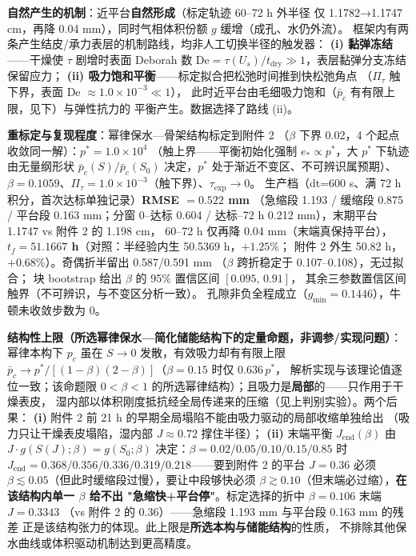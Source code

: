 \documentclass[12pt,a4paper]{ctexart}
\numberwithin{equation}{section}
\begin{document}
\textbf{自然产生的机制}：近平台\textbf{自然形成}（标定轨迹 60--72 h 外半径
仅 1.1782→1.1747 cm，再降 0.04 mm），同时气相体积份额 $g$ 缓增（成孔、水仍外流）。
框架内有两条产生结皮/承力表层的机制路线，均非人工切换半径的触发器：
\textbf{(i) 黏弹冻结}——干燥使 $\tau$ 剧增时表面 Deborah 数
$\mathrm{De}=\tau(U_s)/t_{\mathrm{dry}}\gg1$，表层黏弹分支冻结保留应力；
\textbf{(ii) 吸力饱和平衡}——标定拟合把松弛时间推到快松弛角点
（$\Pi_\tau$ 触下界，表面 De $\approx1.0\times10^{-3}\ll1$），
此时近平台由毛细吸力饱和（$\bar p_c$ 有有限上限，见下）与弹性抗力的
平衡产生。数据选择了路线 (ii)。

\textbf{重标定与复现程度}：幂律保水—骨架结构标定到附件 2
（$\beta$ 下界 0.02，4 个起点收敛同一解）：$p^*=1.0\times10^{4}$
（触上界——平衡初始化强制 $e_*\propto p^*$，大 $p^*$ 下轨迹由无量纲形状
$\bar p_c(S)/\bar p_c(S_0)$ 决定，$p^*$ 处于渐近不变区、不可辨识属预期）、
$\beta=0.1059$、$\Pi_\tau=1.0\times10^{-3}$（触下界）、$\tau_{\exp}\to0$。
生产档（dt=600 s、满 72 h 积分，首次达标单独记录）\textbf{RMSE $=0.522$ mm}
（急缩段 1.193 / 缓缩段 0.875 / 平台段 0.163 mm；分窗 0--达标 0.604 /
达标--72 h 0.212 mm），末期平台 1.1747 vs 附件 2 的 1.198 cm，
60--72 h 仅再降 0.04 mm（末端真保持平台），
\textbf{$t_f=51.1667$ h}（对照：半经验内生 50.5369 h，$+1.25\%$；
附件 2 外生 50.82 h，$+0.68\%$）。奇偶折半留出 0.587/0.591 mm
（$\beta$ 跨折稳定于 0.107--0.108），无过拟合；
块 bootstrap 给出 $\beta$ 的 95\% 置信区间 $[0.095,\,0.91]$，
其余三参数置信区间触界（不可辨识，与不变区分析一致）。
孔隙非负全程成立（$g_{\min}=0.1446$），牛顿未收敛步数为 0。

\textbf{结构性上限（所选幂律保水—简化储能结构下的定量命题，非调参/实现问题）}：
幂律本构下 $p_c$ 虽在 $S\to0$ 发散，有效吸力却有有限上限
$\bar p_c\to p^*/[(1-\beta)(2-\beta)]$（$\beta=0.15$ 时仅 $0.636\,p^*$，
解析实现与该理论值逐位一致；该命题限 $0<\beta<1$ 的所选幂律结构）；且吸力是\textbf{局部}的——只作用于干燥表皮，
湿内部以体积刚度抵抗经全局传递来的压缩（见上判别实验）。两个后果：
\textbf{(i)} 附件 2 前 21 h 的早期全局塌陷不能由吸力驱动的局部收缩单独给出
（吸力只让干燥表皮塌陷，湿内部 $J\approx0.72$ 撑住半径）；
\textbf{(ii)} 末端平衡 $J_{\mathrm{end}}(\beta)$ 由
$J\cdot g(S(J);\beta)=g(S_0;\beta)$ 决定：$\beta=0.02/0.05/0.10/0.15/0.85$
时 $J_{\mathrm{end}}=0.368/0.356/0.336/0.319/0.218$——要到附件 2 的平台
$J=0.36$ 必须 $\beta\lesssim0.05$（但此时缓缩段过慢），要让中段够快必须
$\beta\gtrsim0.10$（但末端必过缩），\textbf{在该结构内单一 $\beta$ 给不出
"急缩快+平台停"}。标定选择的折中 $\beta=0.106$ 末端 $J=0.3343$
（vs 附件 2 的 0.36）——急缩段 1.193 mm 与平台段 0.163 mm 的残差
正是该结构张力的体现。此上限是\textbf{所选本构与储能结构}的性质，
不排除其他保水曲线或体积驱动机制达到更高精度。
\end{document}
